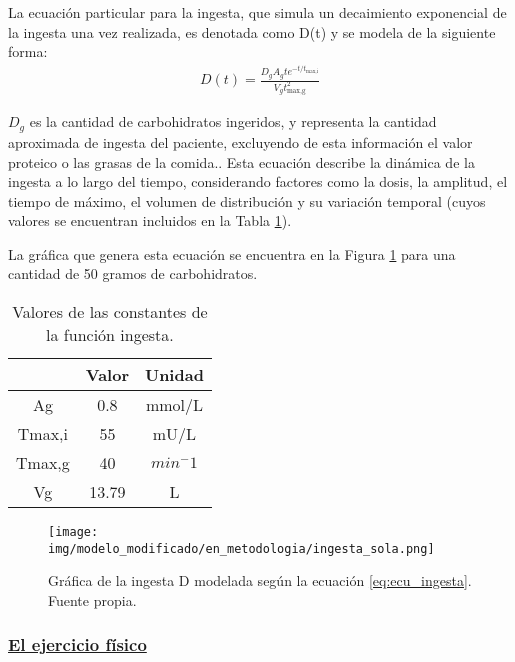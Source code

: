 La ecuación particular para la ingesta, que simula un decaimiento exponencial de la ingesta una vez realizada, es denotada como D(t) y se modela de la siguiente forma:
\begin{align}
    D(t)= \frac{D_g A_g t e^{-t/t_\text{max,i}}}{V_g t^{2}_\text{max,g}} \label{eq:ecu_ingesta}
\end{align}

$D_g$ es la cantidad de carbohidratos ingeridos, y representa la cantidad aproximada de ingesta del paciente, excluyendo de esta información el valor proteico o las grasas de la comida..
Esta ecuación describe la dinámica de la ingesta a lo largo del tiempo, considerando factores como la dosis, la amplitud, el tiempo de máximo, el volumen de distribución y su variación temporal (cuyos valores se encuentran incluidos en la Tabla \ref{tab:parametros_ingesta}).

La gráfica que genera esta ecuación se encuentra en la Figura \ref{fig:grafica_ingesta} para una cantidad de 50 gramos de carbohidratos. 

\begin{table}[htbp]
    \centering
    \caption{Valores de las constantes de la función ingesta.}
    \begin{tabular}{|c|c|c|}
        \hline
          & Valor & Unidad  \\
        \hline
        Ag & 0.8 & mmol/L \\
        Tmax,i & 55 & mU/L \\
        Tmax,g & 40 & $min^-1$ \\
        Vg & 13.79 & L \\
        \hline
    \end{tabular}
    \label{tab:parametros_ingesta}
\end{table}


\begin{figure}[htbp]
    \centering
    \texttt{[image: img/modelo\_modificado/en\_metodologia/ingesta\_sola.png]}
    \caption{Gráfica de la ingesta D modelada según la ecuación \ref{eq:ecu_ingesta}. Fuente propia.}
    \label{fig:grafica_ingesta}
\end{figure}


\subsubsection{\underline{El ejercicio físico}}

